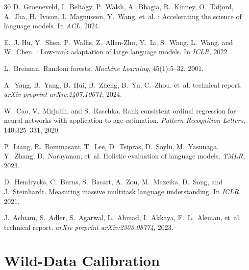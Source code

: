 \documentclass[11pt,a4paper]{article}
\begin{document}
\begin{thebibliography}{30}
D.~Groeneveld, I.~Beltagy, P.~Walsh, A.~Bhagia, R.~Kinney, O.~Tafjord, A.~Jha, H.~Ivison, I.~Magnusson, Y.~Wang, et~al.
: Accelerating the science of language models.
\newblock In \emph{ACL}, 2024.

E.~J. Hu, Y.~Shen, P.~Wallis, Z.~Allen-Zhu, Y.~Li, S.~Wang, L.~Wang, and W.~Chen.
: Low-rank adaptation of large language models.
\newblock In \emph{ICLR}, 2022.

L.~Breiman.
\newblock Random forests.
\newblock \emph{Machine Learning}, 45(1):5--32, 2001.

A.~Yang, B.~Yang, B.~Hui, B.~Zheng, B.~Yu, C.~Zhou, et~al.
 technical report.
\newblock \emph{arXiv preprint arXiv:2407.10671}, 2024.

W.~Cao, V.~Mirjalili, and S.~Raschka.
\newblock Rank consistent ordinal regression for neural networks with application to age estimation.
\newblock \emph{Pattern Recognition Letters}, 140:325--331, 2020.

P.~Liang, R.~Bommasani, T.~Lee, D.~Tsipras, D.~Soylu, M.~Yasunaga, Y.~Zhang, D.~Narayanan, et~al.
\newblock Holistic evaluation of language models.
\newblock \emph{TMLR}, 2023.

D.~Hendrycks, C.~Burns, S.~Basart, A.~Zou, M.~Mazeika, D.~Song, and J.~Steinhardt.
\newblock Measuring massive multitask language understanding.
\newblock In \emph{ICLR}, 2021.

J.~Achiam, S.~Adler, S.~Agarwal, L.~Ahmad, I.~Akkaya, F.~L.~Aleman, et~al.
 technical report.
\newblock \emph{arXiv preprint arXiv:2303.08774}, 2023.

\end{thebibliography}

\appendix

\section{Wild-Data Calibration}
\label{app:wild}
\end{document}
